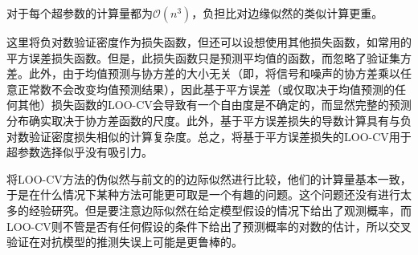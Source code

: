 \documentclass[12pt,UTF8]{article}
\begin{document}
                对于每个超参数的计算量都为$\mathcal{O}(n^3)$，负担比对边缘似然的类似计算更重。\par
                这里将负对数验证密度作为损失函数，但还可以设想使用其他损失函数，如常用的平方误差损失函数。但是，此损失函数只是预测平均值的函数，而忽略了验证集方差。此外，由于均值预测与协方差的大小无关（即，将信号和噪声的协方差乘以任意正常数不会改变均值预测结果），因此基于平方误差（或仅取决于均值预测的任何其他）损失函数的LOO-CV会导致有一个自由度是不确定的，而显然完整的预测分布确实取决于协方差函数的尺度。此外，基于平方误差损失的导数计算具有与负对数验证密度损失相似的计算复杂度。总之，将基于平方误差损失的LOO-CV用于超参数选择似乎没有吸引力。\par
                将LOO-CV方法的伪似然与前文的的边际似然进行比较，他们的计算量基本一致，于是在什么情况下某种方法可能更可取是一个有趣的问题。这个问题还没有进行太多的经验研究。但是要注意边际似然在给定模型假设的情况下给出了观测概率，而LOO-CV则不管是否有任何假设的条件下给出了预测概率的对数的估计，所以交叉验证在对抗模型的推测失误上可能是更鲁棒的。
\end{document}
